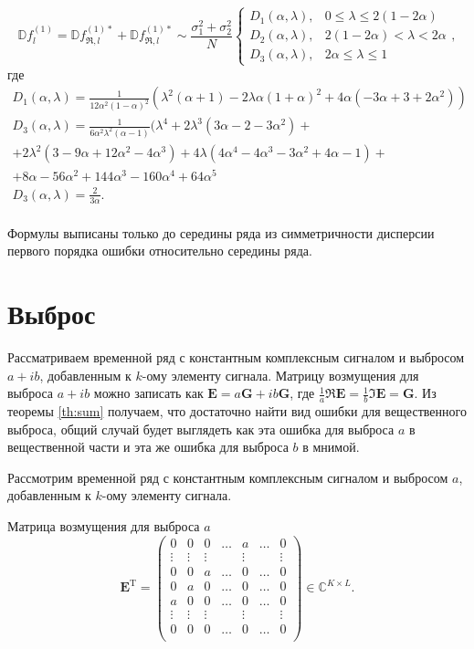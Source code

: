 \documentclass[specialist,
               substylefile = spbu.rtx,
               subf,href,colorlinks=true, 12pt]{disser}
\begin{document}
$$    
\mathbb{D} f^{(1)}_l = \mathbb{D} f^{(1)*}_{\Re, l} + \mathbb{D} f^{(1)*}_{\Re, l} \sim \frac{\sigma^2_1 + \sigma^2_2}{N}
\begin{cases}
	D_1(\alpha, \lambda), &\text{$0 \leq \lambda \leq 2 (1 - 2\alpha)$}\\
	D_2(\alpha, \lambda), &\text{$2 (1 - 2\alpha) < \lambda < 2\alpha$}\\
	D_3(\alpha, \lambda), &\text{$2\alpha \leq \lambda \leq 1$}
\end{cases},
$$
где
\begin{gather*}
	D_1(\alpha, \lambda) = \frac{1}{12 \alpha^2(1 - \alpha)^2} (\lambda^2(\alpha + 1) - 2\lambda\alpha(1 + \alpha)^2 + 4 \alpha(-3\alpha + 3 + 2\alpha^2))\\
	D_3(\alpha, \lambda) = \frac{1}{6 \alpha^2\lambda^2 (\alpha - 1)} (\lambda^4 + 2\lambda^3(3\alpha -2 -3\alpha^2) + \\
	+ 2\lambda^2(3 - 9\alpha + 12\alpha^2 - 4\alpha^3) + 4\lambda(4 \alpha^4 - 4\alpha^3 - 3\alpha^2 + 4\alpha - 1) +\\
	+ 8\alpha - 56 \alpha^2 + 144\alpha^3 - 160\alpha^4 + 64\alpha^5\\
	D_3(\alpha, \lambda) = \frac{2}{3\alpha}.\\
\end{gather*}

Формулы выписаны только до середины ряда из симметричности дисперсии первого порядка ошибки относительно середины ряда.

\section{Выброс}
Рассматриваем временной ряд с константным комплексным сигналом и выбросом $a + ib$, добавленным к $k$-ому элементу сигнала. Матрицу возмущения для выброса $a + ib$ можно записать как  $\mathbf{E} = a\mathbf{G} + ib\mathbf{G}$, где $\frac{1}{a}\Re\mathbf{E} = \frac{1}{b}\Im\mathbf{E}  = \mathbf{G}$. Из теоремы \ref{th:sum} получаем, что достаточно найти вид ошибки для вещественного выброса, общий случай будет выглядеть как эта ошибка для выброса $a$ в вещественной части и эта же ошибка для выброса $b$ в мнимой.  

Рассмотрим временной ряд с константным комплексным сигналом и выбросом $a$, добавленным к $k$-ому элементу сигнала.

Матрица возмущения для выброса $a$
$$\mathbf{E}^{\mathrm{T}} = \begin{pmatrix}
	0 & 0 & 0 & \ldots &  a  & \ldots & 0\\
	 \vdots &\vdots & \vdots & &  \vdots & & \vdots\\
	0 & 0 & a & \ldots & 0 & \ldots & 0\\
	0 & a & 0 & \ldots & 0 & \ldots & 0\\
	a & 0 & 0 & \ldots & 0 & \ldots & 0\\
	\vdots &\vdots & \vdots & & \vdots & & \vdots\\
	0 & 0 & 0 & \ldots & 0 & \ldots & 0\\
\end{pmatrix} \in \mathbb{C}^{K \times L}.$$
\end{document}
